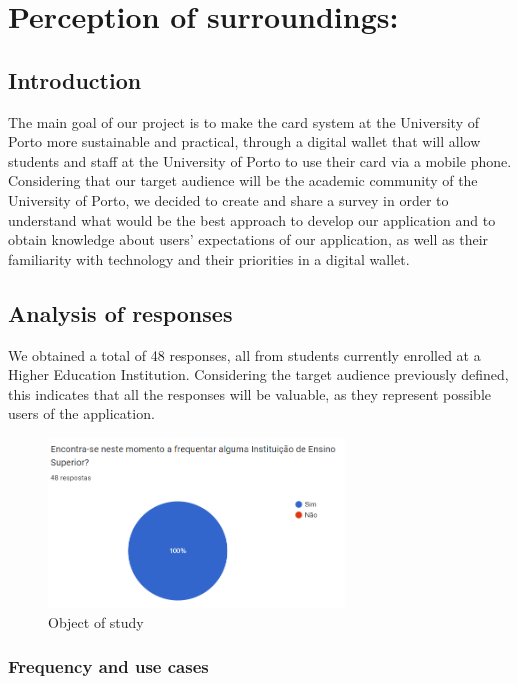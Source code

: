 \documentclass[10pt]{article}
\begin{document}
\section{Perception of surroundings:}

\subsection{Introduction}

The main goal of our project is to make the card system at the University of Porto more sustainable and practical, through a digital wallet that will allow students and staff at the University of Porto to use their card via a mobile phone.
Considering that our target audience will be the academic community of the University of Porto, we decided to create and share a survey in order to understand what would be the best approach to develop our application and
to obtain knowledge about users' expectations of our application, as well as their familiarity with technology and their priorities in a digital wallet.

\subsection{Analysis of responses}


We obtained a total of 48 responses, all from students currently enrolled at a Higher Education Institution. Considering the target audience previously defined, this indicates that all the responses will be valuable, as they represent possible users of the application.

\begin{figure}[h]
    \centering
    \includegraphics[width=0.7\textwidth]{report-images/questionaire1.png}
    \caption{Object of study}
\end{figure}


\subsubsection{Frequency and use cases}
\end{document}
